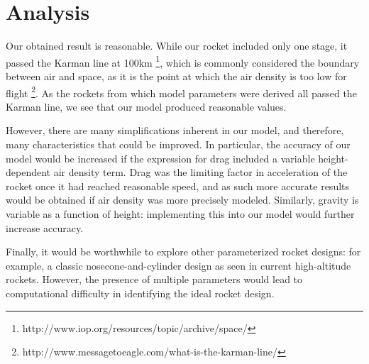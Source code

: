 \documentclass[]{article}
\begin{document}
\section{Analysis}

Our obtained result is reasonable. While our rocket included only one stage, it passed the Karman line at 100km \footnote{http://www.iop.org/resources/topic/archive/space/}, which is commonly considered the boundary between air and space, as it is the point at which the air density is too low for flight \footnote{http://www.messagetoeagle.com/what-is-the-karman-line/}. As the rockets from which model parameters were derived all passed the Karman line, we see that our model produced reasonable values.

However, there are many simplifications inherent in our model, and therefore, many characteristics that could be improved. In particular, the accuracy of our model would be increased if the expression for drag included a variable height-dependent air density term. Drag was the limiting factor in acceleration of the rocket once it had reached reasonable speed, and as such more accurate results would be obtained if air density was more precisely modeled. Similarly, gravity is variable as a function of height: implementing this into our model would further increase accuracy.

Finally, it would be worthwhile to explore other parameterized rocket designs: for example, a classic nosecone-and-cylinder design as seen in current high-altitude rockets. However, the presence of multiple parameters would lead to computational difficulty in identifying the ideal rocket design.
\end{document}
